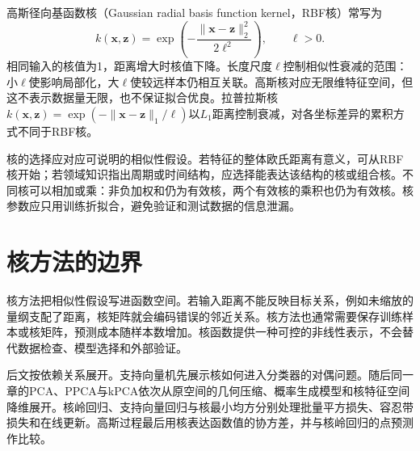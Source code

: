 高斯径向基函数核（Gaussian radial basis function kernel，RBF核）常写为
\begin{equation}
 k(\bm x,\bm z)=\exp\left(-\frac{\|\bm x-\bm z\|_2^2}{2\ell^2}\right),\qquad \ell>0.
\end{equation}
相同输入的核值为1，距离增大时核值下降。长度尺度$\ell$控制相似性衰减的范围：小$\ell$使影响局部化，大$\ell$使较远样本仍相互关联。高斯核对应无限维特征空间，但这不表示数据量无限，也不保证拟合优良。拉普拉斯核$k(\bm x,\bm z)=\exp(-\|\bm x-\bm z\|_1/\ell)$以$L_1$距离控制衰减，对各坐标差异的累积方式不同于RBF核。

核的选择应对应可说明的相似性假设。若特征的整体欧氏距离有意义，可从RBF核开始；若领域知识指出周期或时间结构，应选择能表达该结构的核或组合核。不同核可以相加或乘：非负加权和仍为有效核，两个有效核的乘积也仍为有效核。核参数应只用训练折拟合，避免验证和测试数据的信息泄漏。

\section{核方法的边界}
核方法把相似性假设写进函数空间。若输入距离不能反映目标关系，例如未缩放的量纲支配了距离，核矩阵就会编码错误的邻近关系。核方法也通常需要保存训练样本或核矩阵，预测成本随样本数增加。核函数提供一种可控的非线性表示，不会替代数据检查、模型选择和外部验证。

后文按依赖关系展开。支持向量机先展示核如何进入分类器的对偶问题。随后同一章的PCA、PPCA与kPCA依次从原空间的几何压缩、概率生成模型和核特征空间降维展开。核岭回归、支持向量回归与核最小均方分别处理批量平方损失、容忍带损失和在线更新。高斯过程最后用核表达函数值的协方差，并与核岭回归的点预测作比较。
